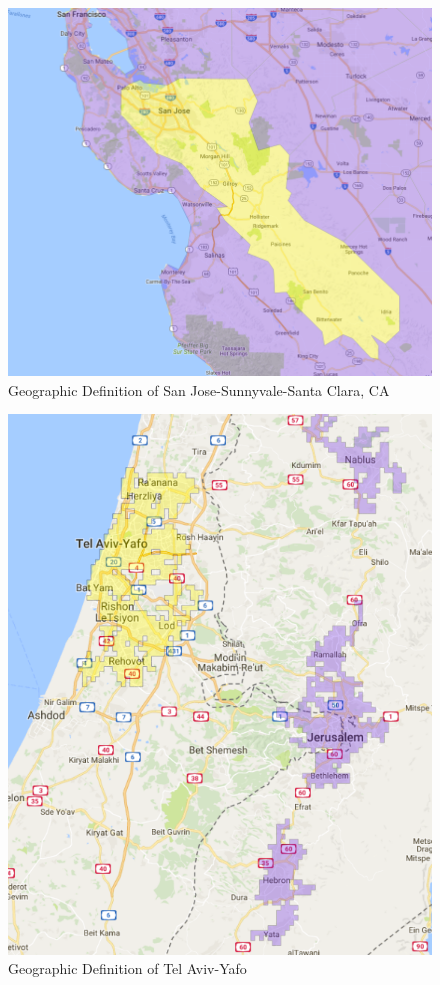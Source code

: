\documentclass[12pt]{article}
\begin{document}
\begin{figure}[h]
\begin{centering}
  \includegraphics[width=\textwidth]{SanJose}
  \caption{Geographic Definition of San Jose-Sunnyvale-Santa Clara, CA}
   \label{fig:SanJose}
\end{centering}
\end{figure}

\begin{figure}[h]
\begin{centering}
  \includegraphics[width=\textwidth]{TelAviv}
  \caption{Geographic Definition of Tel Aviv-Yafo}
   \label{fig:TelAviv}
\end{centering}
\end{figure}
\end{document}
